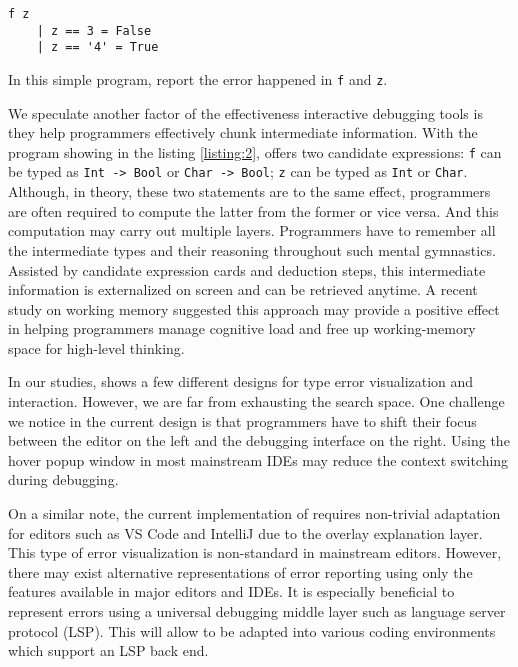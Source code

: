 \begin{listing}[!ht]
\begin{verbatim}
f z     
    | z == 3 = False
    | z == '4' = True
\end{verbatim}
\caption{     In this simple program, \chameleon{} report the error happened in \texttt{f} and \texttt{z}.}
\label{listing:2}
\end{listing}

We speculate another factor of the effectiveness \chameleon{} interactive debugging tools is they help programmers effectively chunk intermediate information. With the program showing in the listing \ref{listing:2}, \chameleon{} offers two candidate expressions: \texttt{f} can be typed as \texttt{Int -> Bool} or \texttt{Char -> Bool}; \texttt{z} can be typed as \texttt{Int} or \texttt{Char}. Although, in theory, these two statements are to the same effect, programmers are often required to compute the latter from the former or vice versa. And this computation may carry out multiple layers. Programmers have to remember all the intermediate types and their reasoning throughout such mental gymnastics. Assisted by candidate expression cards and deduction steps, this intermediate information is externalized on screen and can be retrieved anytime. A recent study on working memory \cite{crichton_role_2021} suggested this approach may provide a positive effect in helping programmers manage cognitive load and free up working-memory space for high-level thinking.


In our studies, \chameleon{} shows a few different designs for type error visualization and interaction. However, we are far from exhausting the search space. One challenge we notice in the current design is that programmers have to shift their focus between the editor on the left and the \chameleon{} debugging interface on the right. Using the hover popup window in most mainstream IDEs may reduce the context switching during debugging.

On a similar note, the current implementation of \chameleon{} requires non-trivial adaptation for editors such as VS Code and IntelliJ due to the overlay explanation layer. This type of error visualization is non-standard in mainstream editors. However, there may exist alternative representations of \chameleon{} error reporting using only the features available in major editors and IDEs. It is especially beneficial to represent \chameleon{} errors using a universal debugging middle layer such as language server protocol (LSP). This will allow \chameleon{}  to be adapted into various coding environments which support an LSP back end.

